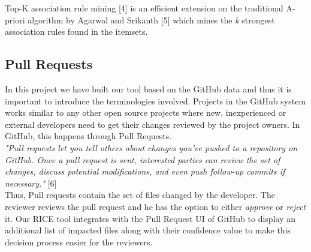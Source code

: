 Top-K association rule mining [4] is an efficient extension on the traditional A-priori algorithm by Agarwal and Srikanth [5] which mines the \textit{k} strongest association rules found in the itemsets.


\subsection{Pull Requests}

In this project we have built our tool based on the GitHub data and thus it is important to introduce the terminologies involved. Projects in the GitHub system works similar to any other open source projects where new, inexperienced or external developers need to get their changes reviewed by the project owners. In GitHub, this happens through Pull Requests.\\

\textit{"Pull requests let you tell others about changes you've pushed to a repository on GitHub. Once a pull request is sent, interested parties can review the set of changes, discuss potential modifications, and even push follow-up commits if necessary."} [6] \\

Thus, Pull requests contain the set of files changed by the developer. The reviewer reviews the pull request and he has the option to either \textit{approve} or \textit{reject} it. Our RICE tool integrates with the Pull Request UI of GitHub to display an additional list of impacted files along with their confidence value to make this decision process easier for the reviewers.   



